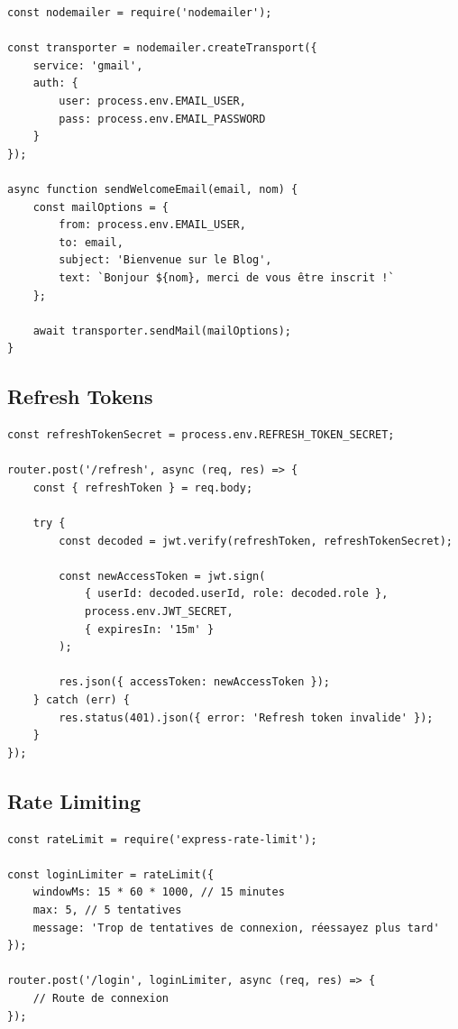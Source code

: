 \begin{lstlisting}[style=javascript, caption=Envoi d'emails avec Nodemailer]
const nodemailer = require('nodemailer');

const transporter = nodemailer.createTransport({
    service: 'gmail',
    auth: {
        user: process.env.EMAIL_USER,
        pass: process.env.EMAIL_PASSWORD
    }
});

async function sendWelcomeEmail(email, nom) {
    const mailOptions = {
        from: process.env.EMAIL_USER,
        to: email,
        subject: 'Bienvenue sur le Blog',
        text: `Bonjour ${nom}, merci de vous être inscrit !`
    };
    
    await transporter.sendMail(mailOptions);
}
\end{lstlisting}

\subsection{Refresh Tokens}

\begin{lstlisting}[style=javascript, caption=Implémentation des refresh tokens]
const refreshTokenSecret = process.env.REFRESH_TOKEN_SECRET;

router.post('/refresh', async (req, res) => {
    const { refreshToken } = req.body;
    
    try {
        const decoded = jwt.verify(refreshToken, refreshTokenSecret);
        
        const newAccessToken = jwt.sign(
            { userId: decoded.userId, role: decoded.role },
            process.env.JWT_SECRET,
            { expiresIn: '15m' }
        );
        
        res.json({ accessToken: newAccessToken });
    } catch (err) {
        res.status(401).json({ error: 'Refresh token invalide' });
    }
});
\end{lstlisting}

\subsection{Rate Limiting}

\begin{lstlisting}[style=javascript, caption=Rate limiting avec express-rate-limit]
const rateLimit = require('express-rate-limit');

const loginLimiter = rateLimit({
    windowMs: 15 * 60 * 1000, // 15 minutes
    max: 5, // 5 tentatives
    message: 'Trop de tentatives de connexion, réessayez plus tard'
});

router.post('/login', loginLimiter, async (req, res) => {
    // Route de connexion
});
\end{lstlisting}

